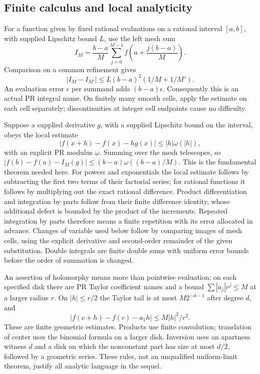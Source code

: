 \subsection{Finite calculus and local analyticity}
For a function given by fixed rational evaluations on a rational interval
$[a,b]$, with supplied Lipschitz bound $L$, use the left mesh sum
\[
 I_M=\frac{b-a}{M}\sum_{j=0}^{M-1}
 f\!\left(a+\frac{j(b-a)}M\right).
\]
Comparison on a common refinement gives
\[
 |I_M-I_{M'}|\le L(b-a)^2(1/M+1/M').             \tag{F7}\label{eq:quad}
\]
An evaluation error $\epsilon$ per summand adds $(b-a)\epsilon$.
Consequently this is an actual PR integral name. On finitely many smooth
cells, apply the estimate on each cell separately; discontinuities at
integer cell endpoints cause no difficulty.

Suppose a supplied derivative $g$, with a supplied Lipschitz bound on the
interval, obeys the local estimate
\[
 |f(x+h)-f(x)-hg(x)|\le |h|\omega(|h|),
\]
with an explicit PR modulus $\omega$. Summing over the mesh telescopes,
so $|f(b)-f(a)-I_M(g)|\le(b-a)\omega((b-a)/M)$. This is the
fundamental theorem needed here. For powers and exponentials the local
estimate follows by subtracting the first two terms of their factorial
series; for rational functions it follows by multiplying out the exact
rational difference. Product differentiation and integration by parts
follow from their finite difference identity, whose additional defect is
bounded by the product of the increments. Repeated integration by parts
therefore means a finite repetition with its error allocated in advance.
Changes of variable used below follow by comparing images of mesh cells,
using the explicit derivative and second-order remainder of the given
substitution. Double integrals are finite double sums with uniform error
bounds before the order of summation is changed.

An assertion of holomorphy means more than pointwise evaluation: on each
specified disk there are PR Taylor coefficient names and a bound
$\sum |a_j|r^j\le M$ at a larger radius $r$. On $|h|\le r/2$ the
Taylor tail is at most $M2^{-d-1}$ after degree $d$, and
\[
 |f(c+h)-f(c)-a_1h|\le M|h|^2/r^2.
\]
These are finite geometric estimates. Products use finite convolution;
translation of center uses the binomial formula on a larger disk.
Inversion uses an apartness witness $d$ and a disk on which the
nonconstant part has size at most $d/2$, followed by a geometric series.
These rules, not an unqualified uniform-limit theorem, justify all
analytic language in the sequel.
